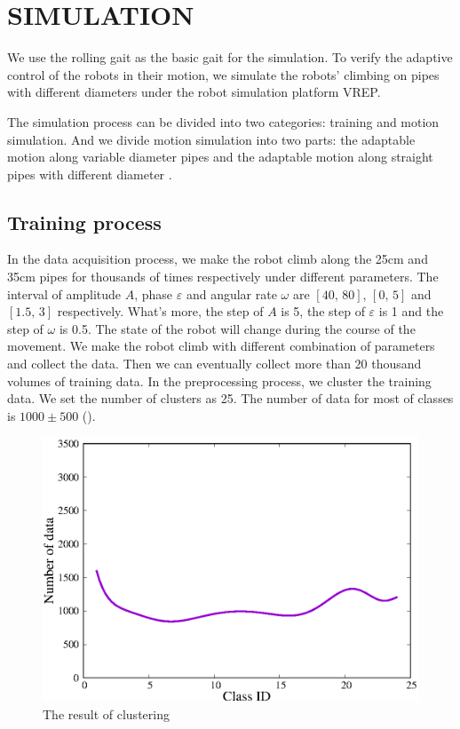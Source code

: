 \section{SIMULATION}
We use the rolling gait as the basic gait for the simulation. To verify the adaptive control of the robots in their motion, we simulate the robots' climbing on pipes with different diameters under the robot simulation platform VREP.

The simulation process can be divided into two categories: training and motion simulation. And we divide motion simulation into two parts: the adaptable motion along variable diameter pipes and the adaptable motion along straight pipes with different diameter .

\subsection{Training process}

In the data acquisition process, we make the robot climb along the 25cm and 35cm pipes for thousands of times respectively under different parameters. The interval of amplitude $A$, phase $\varepsilon$ and angular rate $\omega$ are $[40, \, 80]$, $[0, \, 5]$ and $[1.5, \, 3]$ respectively. What's more, the step of $A$ is 5, the step of $\varepsilon$ is 1 and the step of $\omega$ is 0.5. The state of the robot will change during the course of the movement. We make the robot climb with different combination of parameters and collect the data. Then we can eventually collect more than 20 thousand volumes of training data. In the preprocessing process, we cluster the training data. We set the number of clusters as 25. The number of data for most of classes is $1000 \pm 500 $ ().

\begin{figure}[t]
	\centering
	\includegraphics[width=0.6\linewidth]{fig/experiment/170912/cluster}
	\caption{The result of clustering}
\end{figure}

